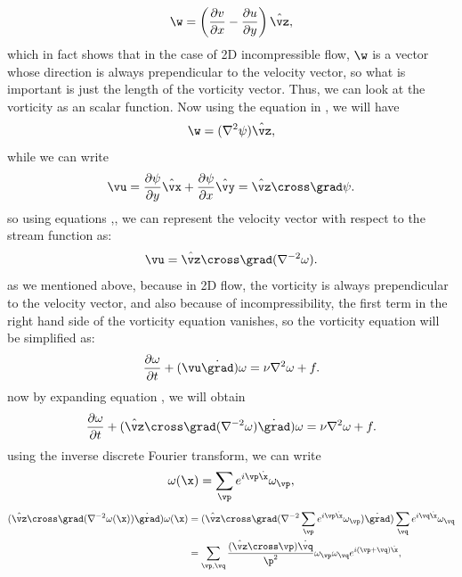 \documentclass[12pt]{article}
\def\v{\bm}
\def\lap{{\nabla}^2}
\def\lapinv{{\nabla}^{-2}}
\def\vw{{\v\w}}
\begin{document}
\begin{equation}\label{Eq-4}
\vw=\left(\frac{\partial v}{\partial x}-\frac{\partial u}{\partial y}\right)\hat{\vz},
\end{equation}
which in fact shows that in the case of 2D incompressible flow, $\vw$ is a vector whose direction is always prependicular to the velocity vector, so what is important is just the length of the vorticity vector. Thus, we can look at the vorticity as an scalar function. Now using the equation  in , we will have
\begin{equation}\label{Eq-5}
\vw=(\lap\psi)\hat{\vz},
\end{equation}
while we can write
\begin{equation}\label{Eq-6}
\vu=\frac{\partial\psi}{\partial y}\hat{\vx}+\frac{\partial\psi}{\partial x}\hat{\vy}=\hat{\vz}\cross\grad\psi.
\end{equation}
so using equations ,, we can represent the velocity vector with respect to the stream function as:
\begin{equation}\label{Eq-7}
\vu=\hat{\vz}\cross\grad(\lapinv\omega).
\end{equation}
as we mentioned above, because in 2D flow, the vorticity is always prependicular to the velocity vector, and also because of incompressibility, the first term in the right hand side of the vorticity equation vanishes, so the vorticity equation will be simplified as:
\begin{equation}\label{Eq-8}
\frac{\partial \omega}{\partial t} + (\vu\dot\grad)\omega= \nu\lap\omega + f.
\end{equation}
now by expanding equation , we will obtain
\begin{equation}\label{Eq-9}
\frac{\partial \omega}{\partial t} + (\hat{\vz}\cross\grad(\lapinv\omega)\dot\grad)\omega= \nu\lap\omega + f.
\end{equation}
using the inverse discrete Fourier transform, we can write
\begin{equation*}
\omega(\x)=\sum_{\vp}{e^{i\vp\dot\x}\omega_{\vp}}, 
\end{equation*}
\begin{align*}
(\hat{\vz}\cross\grad(\lapinv\omega(\x))\dot\grad)\omega(\x) &=(\hat{\vz}\cross\grad(\lapinv\sum_{\vp}{e^{i\vp\dot\x}\omega_{\vp}})\dot\grad)\sum_{\vq}{e^{i\vq\dot\x}\omega_{\vq}} \\
&=\sum_{\vp,\vq}{\frac{(\hat{\vz}\cross\vp)\dot\vq}{\p^2}\omega_{\vp}\omega_{\vq}e^{i(\vp+\vq)\dot\x}},
\end{align*}
\end{document}
